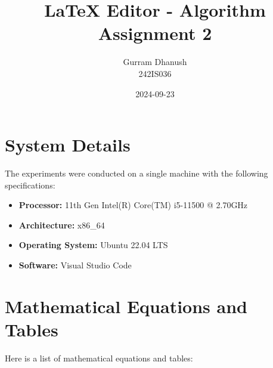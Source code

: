 \documentclass{article}
\begin{document}
\title{LaTeX Editor - Algorithm Assignment 2}
\author{Gurram Dhanush \\ 242IS036}
\date{2024-09-23}
\maketitle

\section{System Details}
The experiments were conducted on a single machine with the following specifications:
\begin{itemize}
    \item \textbf{Processor:} 11th Gen Intel(R) Core(TM) i5-11500 @ 2.70GHz
    \item \textbf{Architecture:} x86\_64
    \item \textbf{Operating System:} Ubuntu 22.04 LTS
    \item \textbf{Software:} Visual Studio Code
\end{itemize}

\section{Mathematical Equations and Tables}
Here is a list of mathematical equations and tables:
\end{document}
